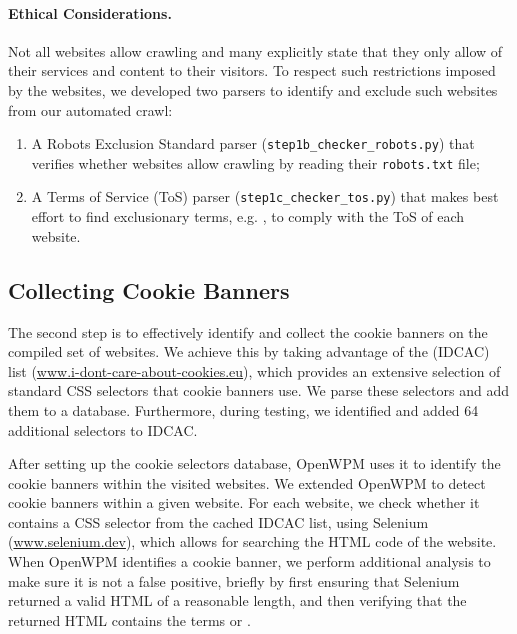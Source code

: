 \paragraph{Ethical Considerations.}
Not all websites allow crawling and many explicitly state that they only allow  of their services and content to their visitors. To respect such restrictions imposed by the websites, we developed two parsers to identify and exclude such websites from our automated crawl: 

\begin{enumerate}
    \item A Robots Exclusion Standard parser (\texttt{step1b\_checker\_robots.py}) that verifies whether websites allow crawling by reading their \texttt{robots.txt} file;
    
    \item A Terms of Service (ToS) parser (\texttt{step1c\_checker\_tos.py}) that makes best effort to find exclusionary terms, e.g. , to comply with the ToS of each website.
\end{enumerate}

\subsection{Collecting Cookie Banners}
The second step is to effectively identify and collect the cookie banners on the compiled set of websites. We achieve this by taking advantage of the  (IDCAC) list (\url{www.i-dont-care-about-cookies.eu}), which provides an extensive selection of standard CSS selectors that cookie banners use. We parse these selectors and add them to a database. Furthermore, during testing, we identified and added 64 additional selectors to IDCAC.

After setting up the cookie selectors database, OpenWPM uses it to identify the cookie banners within the visited websites. We extended OpenWPM to detect cookie banners within a given website. For each website, we check whether it contains a CSS selector from the cached IDCAC list, using Selenium (\url{www.selenium.dev}), which allows for searching the HTML code of the website. When OpenWPM identifies a cookie banner, we perform additional analysis to make sure it is not a false positive, briefly by first ensuring that Selenium returned a valid HTML of a reasonable length, and then verifying that the returned HTML contains the terms  or . 

